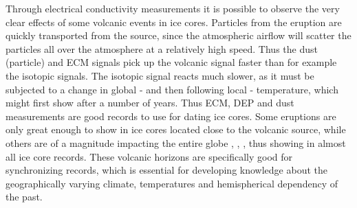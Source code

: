 \documentclass[../../CompleteThesis2/Complete_2ndDraft]{subfiles}
\begin{document}
Through electrical conductivity measurements it is possible to observe the very clear effects of some volcanic events in ice cores. Particles from the eruption are quickly transported from the source, since the atmospheric airflow will scatter the particles all over the atmosphere at a relatively high speed. Thus the dust (particle) and ECM signals pick up the volcanic signal faster than for example the isotopic signals. The isotopic signal reacts much slower, as it must be subjected to a change in global - and then following local - temperature, which might first show after a number of years. Thus ECM, DEP and dust measurements are good records to use for dating ice cores. Some eruptions are only great enough to show in ice cores located close to the volcanic source, while others are of a magnitude impacting the entire globe \cite{Langway1988}, \cite{Wei2008}, \cite{Dai2009}, thus showing in almost all ice core records. These volcanic horizons are specifically good for synchronizing records, which is essential for developing knowledge about the geographically varying climate, temperatures and hemispherical dependency of the past. 
\end{document}
